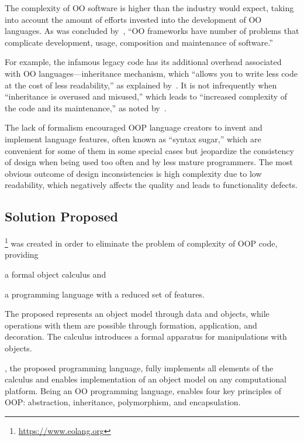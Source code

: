 The complexity of OO software is higher than the industry would expect, taking
into account the amount of efforts invested into the development of
OO languages. As was concluded by~\citet{bosch1997object}, ``OO frameworks have
number of problems that complicate development, usage, composition and
maintenance of software.''

For example, the infamous legacy code has its additional overhead associated with OO
languages---inheritance mechanism, which ``allows you to write less code
at the cost of less readability,'' as explained by~\citet{carter1997oopvsr}.
It is not infrequently when ``inheritance is overused and misused,''
which leads to ``increased complexity of the code and its maintenance,''
as noted by~\citet{bernstein2016legacy}.

The lack of formalism encouraged OOP language creators to
invent and implement language features, often known as ``syntax sugar,''
which are convenient for some of them in some special cases but
jeopardize the consistency of design when being used too often
and by less mature programmers. The most obvious
outcome of design inconsistencies is high complexity due to low readability,
which negatively affects the quality and leads to functionality defects.

\subsection{Solution Proposed}

\eolang{}\footnote{\url{https://www.eolang.org}}
was created in order to eliminate the problem of complexity of
OOP code, providing
\begin{inparaenum}[1)]
  \item a formal object calculus and
  \item a programming language with a reduced set of features.
\end{inparaenum}
The proposed \phic{} represents an object model through
data and objects, while operations with them are possible
through formation, application, and decoration. The calculus
introduces a formal apparatus for manipulations with objects.

\eolang{}, the proposed programming language, fully implements
all elements of the calculus and enables implementation of
an object model on any computational platform.
Being an OO programming language, \eolang{} enables four key principles of OOP:
abstraction, inheritance, polymorphism, and encapsulation.

